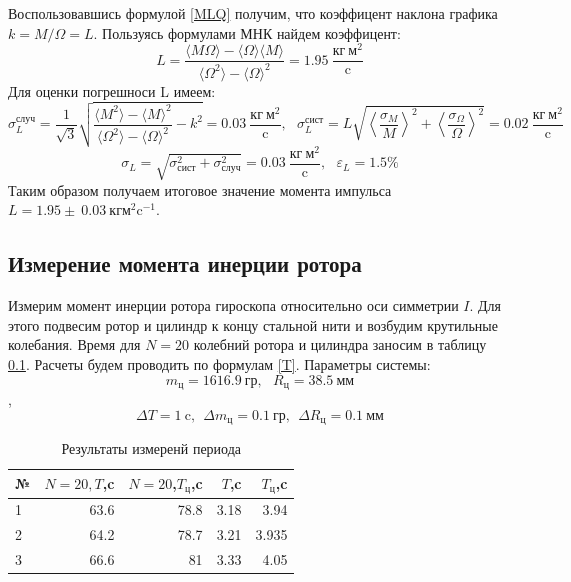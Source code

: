 \documentclass[a4paper,12pt]{article} %
\begin{document}
Воспользовавшись формулой \eqref{MLQ} получим, что коэффицент наклона графика $k=M/ \Omega=L$.
Пользуясь формулами МНК найдем коэффицент:
$$L=\dfrac{\langle M\Omega \rangle-\langle \Omega \rangle \langle M\rangle}{\langle \Omega^2\rangle - \langle \Omega\rangle^2} = 1.95 \ \text{$\dfrac{\text{кг}\ \text{м}^2}{\text{c}}$}$$
Для оценки погрешноси L имеем:\\
$$\sigma_L^\text{случ}=\frac{1}{\sqrt{3}}\sqrt{\frac{\langle M^2 \rangle - \langle M \rangle^2}{\langle \Omega^2 \rangle - \langle \Omega \rangle^2} - k^2 }
 = 0.03\ \text{$\dfrac{\text{кг}\ \text{м}^2}{\text{c}}$}, \ \ \ 
\sigma_L^\text{сист}=L\sqrt{\left \langle \frac{\sigma_{M}}{M}\right \rangle ^2
 + \left \langle \frac{\sigma_{\Omega}}{\Omega}\right \rangle^2}
  = 0.02 \ \text{$\dfrac{\text{кг}\ \text{м}^2}{\text{c}}$}$$
$$\sigma_L=\sqrt{\sigma_\text{сист}^2+\sigma_\text{случ}^2}=0.03 \ \text{$\dfrac{\text{кг}\ \text{м}^2}{\text{c}}$}, \ \ \ \varepsilon_{L}= 1.5 \% $$
Таким образом получаем итоговое значение момента импульса $L=1.95 \pm \ 0.03 \  кг\text{м}^2\text{c}^{-1}$.

\subsection{Измерение момента инерции ротора}
Измерим момент инерции ротора гироскопа относительно оси симметрии $I$.
Для этого подвесим ротор и цилиндр к концу стальной нити и возбудим крутильные колебания.
Время для $N=20$ колебний ротора и цилиндра заносим в таблицу \ref{}. 
Расчеты будем проводить по формулам \eqref{T}. Параметры системы:
$$m_{\text{ц}}=1616.9\ \text{гр}, \ \ \ R_{\text{ц}}=38.5\ \text{мм}$$,
$$ \Delta T=1\ \text{c},\ \ \Delta m_{\text{ц}}=0.1\ \text{гр}, \ \ \Delta R_{\text{ц}}=0.1\ \text{мм}$$

\begin{table}[!h]
    \begin{center}
        \label{table3}
        \begin{tabular}{|l|r|r|r|r|} \hline
            № & $N=20,T$,c & $N=20$,$T_{\text{ц}}$,c & $T$,c & $T_{\text{ц}}$,c \\ \hline
             1 &  63.6 &  78.8 &  3.18 &  3.94 \\ \hline
             2 &  64.2 &  78.7 &  3.21 &  3.935\\ \hline
             3 &  66.6 &  81   &  3.33 &  4.05 \\ \hline
            \end{tabular}
        \caption{Результаты измеренй периода}
    \end{center}
\end{table}
\end{document}
